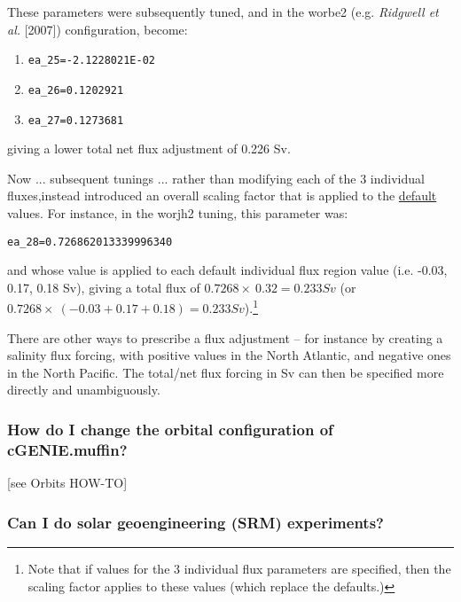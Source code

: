 \documentclass[11pt,fleqn]{book} %
\begin{document}
These parameters were subsequently tuned, and in the \textsf{\small worbe2} (e.g. \textit{Ridgwell et al.} [2007]) configuration, become:
\vspace{1mm}
\begin{enumerate}[noitemsep]
\item \texttt{ea\_25=-2.1228021E-02}
\item \texttt{ea\_26=0.1202921}
\item \texttt{ea\_27=0.1273681}
\end{enumerate}
\vspace{1mm}
giving a lower total net flux adjustment of 0.226 Sv.

Now ... subsequent tunings ... rather than modifying each of the 3 individual fluxes,instead introduced an overall scaling factor that is applied to the \uline{default} values. For instance, in the \textsf{\small worjh2} tuning, this parameter was:
\vspace{-1mm}
\begin{verbatim}
ea_28=0.726862013339996340
\end{verbatim}
\vspace{-1mm}
and whose value is applied to each default individual flux region value (i.e. -0.03, 0.17, 0.18 Sv), giving a total  flux of \(0.7268\times\ 0.32 = 0.233 Sv\) (or \(0.7268\times\ (-0.03+0.17+0.18) = 0.233 Sv\)).\footnote{Note that if values for the 3 individual flux parameters are specified, then the scaling factor applies to these values (which replace the defaults.)}

There are other ways to prescribe a flux adjustment -- for instance  by creating a salinity flux forcing, with positive values in the North Atlantic, and negative ones in the North Pacific. The total/net flux forcing in Sv can then be specified more directly and unambiguously.

%
\subsubsection{How do I change the orbital configuration of cGENIE.muffin?}

[see Orbits HOW-TO]

%
\subsubsection{Can I do solar geoengineering (SRM) experiments?}
\end{document}
